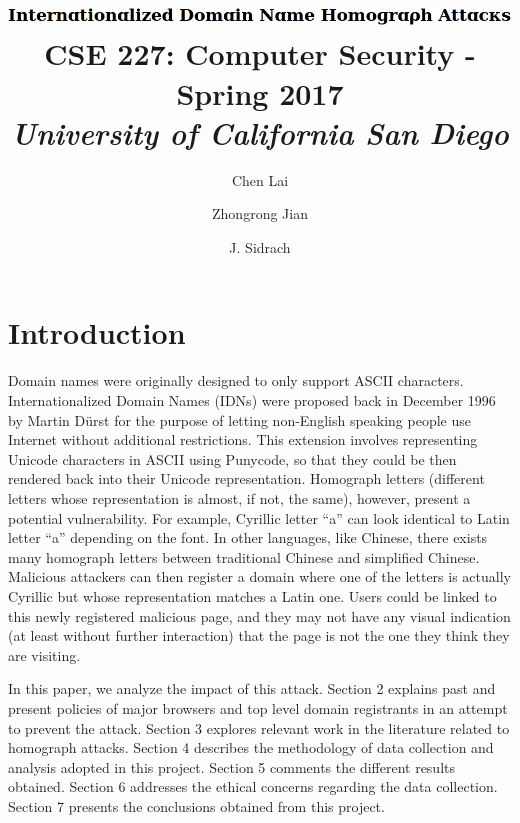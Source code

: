\documentclass[letterpaper,twocolumn,10pt]{article}
\begin{document}
\date{}

\title{\Large
\includegraphics[height=\baselineskip]{title.png}
\\ \vspace{0.65mm} \large \normalfont
CSE 227: Computer Security - Spring 2017 \\ \textit{
University of California San Diego
}}

\author{
{\rm Chen Lai}\\
\and
{\rm Zhongrong Jian}\\
\and
{\rm J. Sidrach}\\
}

\maketitle


\section{Introduction}
Domain names were originally designed to only support ASCII characters.
Internationalized Domain Names (IDNs) were proposed back in December 1996 by Martin D\"{u}rst for the purpose of letting non-English speaking people use Internet without additional restrictions.
This extension involves representing Unicode characters in ASCII using Punycode, so that they could be then rendered back into their Unicode representation.
Homograph letters (different letters whose representation is almost, if not, the same), however, present a potential vulnerability.
For example, Cyrillic letter ``a'' can look identical to Latin letter ``a'' depending on the font.
In other languages, like Chinese, there exists many homograph letters between traditional Chinese and simplified Chinese.
Malicious attackers can then register a domain where one of the letters is actually Cyrillic but whose representation matches a Latin one.
Users could be linked to this newly registered malicious page, and they may not have any visual indication (at least without further interaction) that the page is not the one they think they are visiting.

In this paper, we analyze the impact of this attack.
Section 2 explains past and present policies of major browsers and top level domain registrants in an attempt to prevent the attack.
Section 3 explores relevant work in the literature related to homograph attacks.
Section 4 describes the methodology of data collection and analysis adopted in this project.
Section 5 comments the different results obtained.
Section 6 addresses the ethical concerns regarding the data collection.
Section 7 presents the conclusions obtained from this project.
\end{document}
